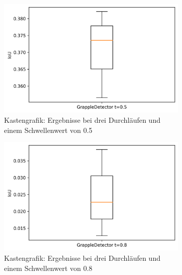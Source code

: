     \begin{figure}[h]
    	\centering
    	\begin{subfigure}[c]{0.29\textwidth}			
    		\includegraphics[width=1\textwidth,center]{bilder/Hauptteil/Autoencoder_Grappel_Detection/IoU_05_AE_Grapple.png}
    		\caption{Kastengrafik: Ergebnisse bei drei Durchläufen und einem Schwellenwert von 0.5}
    		\label{img:BoxPlot_RegressionAufAutoencoder05}	
    	\end{subfigure}
    	\centering
    \begin{subfigure}[c]{0.29\textwidth}			
    	\includegraphics[width=1\textwidth,center]{bilder/Hauptteil/Autoencoder_Grappel_Detection/IoU_08_AE_Grapple.png}
    	\caption{Kastengrafik: Ergebnisse bei drei Durchläufen und einem Schwellenwert von 0.8}
    	\label{img:BoxPlot_RegressionAufAutoencoder08}	
    \end{subfigure}
    	\begin{subfigure}[c]{0.29\textwidth}			

\end{subfigure}
\end{figure}
